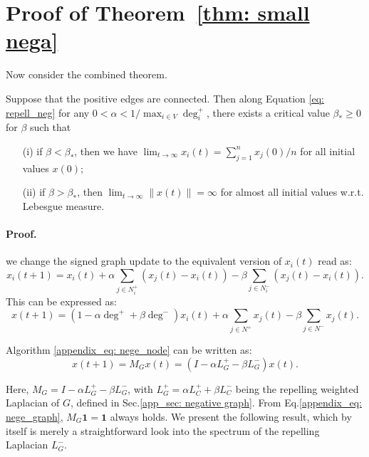 \section{Proof of Theorem~\ref{thm: small nega}}

Now consider the combined theorem. 

\begin{theorem}
\label{app: theorm_positive connected}
    Suppose that the positive edges are connected. Then along Equation \ref{eq: repell_neg} for any \(0 < \alpha < 1/\max_{i \in V} \deg_i^+\), there exists a critical value \(\beta_* \geq 0\) for \(\beta\) such that
    \begin{enumerate}
        \item[(i)] if \(\beta < \beta_*\), then we have \(\lim_{t \to \infty} x_i(t) = \sum_{j=1}^n x_j(0)/n\) for all initial values \(x(0)\);
        \item[(ii)] if \(\beta > \beta_*\), then \(\lim_{t \to \infty} \|x(t)\| = \infty\) for almost all initial values w.r.t. Lebesgue measure.
    \end{enumerate}
\end{theorem}

\paragraph{Proof.}
we change the signed graph update to the equivalent version of \(x_i(t)\) read as:
\[
x_i(t + 1) = x_i(t) + \alpha \sum_{j \in N_i^+} (x_j(t) - x_i(t)) - \beta \sum_{j \in N_i^-} (x_j(t) - x_i(t)).
\]
This can be expressed as:
\begin{equation}
\label{appendix_eq: nege_node}
    x(t + 1) = (1 - \alpha \deg^+ + \beta \deg^-) x_i(t) + \alpha \sum_{j \in N^+} x_j(t) - \beta \sum_{j \in N^-} x_j(t).
\end{equation}


Algorithm \ref{appendix_eq: nege_node} can be written as:
\begin{equation}
\label{appendix_eq: nege_graph}
    x(t + 1) = M_G x(t) = (I - \alpha L_G^+ - \beta L_G^-) x(t).
\end{equation}


Here, \(M_G = I - \alpha L_G^+ - \beta L_G^-\), with \(L_G^+ = \alpha L_C^+ + \beta L_C^-\) being the repelling weighted Laplacian of \(G\), defined in Sec.\ref{app_sec: negative graph}.  
From Eq.\eqref{appendix_eq: nege_graph}, \(M_G \mathbf{1}= \mathbf{1}\) always holds. We present the following result, which by itself is merely a straightforward look into the spectrum of the repelling Laplacian \(L_G^-\).

